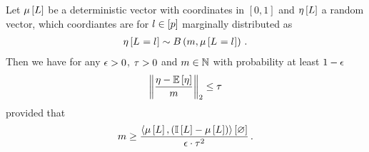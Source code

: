 \begin{theorem}
    \label{the:sphereBoundVariance}
    Let $\mu\left[L\right]$ be a deterministic vector with coordinates in $[0,1]$ and $\eta\left[L\right]$ a random vector, which coordiantes are for $l\in[p]$ marginally distributed as
    \begin{align*}
        \eta\left[L_{}=l_{}\right] \sim B\left(m,\mu\left[L_{}=l_{}\right]\right) \, .
    \end{align*}
    Then we have for any $\epsilon>0$, $\tau>0$ and $m\in\mathbb{N}$ with probability at least $1-\epsilon$
    \begin{align*}
        \left\|\frac{\eta-\mathbb{E}\left[\eta\right]}{m}\right\|_{2} \leq \tau
    \end{align*}
    provided that
    \begin{align*}
        m \geq \frac{\left\langle \mu\left[L\right],(\mathbb{I}\left[L\right]-\mu\left[L\right])\right\rangle \left[ \varnothing \right]}{\epsilon\cdot\tau^2} \, .
    \end{align*}
\end{theorem}
